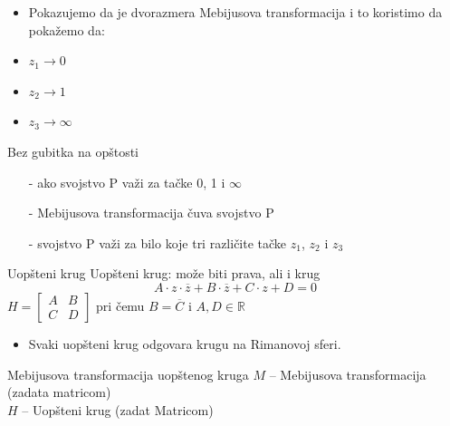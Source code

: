 \documentclass{beamer}
\begin{document}
\begin{frame}
\begin{itemize}
\item Pokazujemo da je dvorazmera Mebijusova transformacija i to 
koristimo da poka\v zemo da:
\item $z_1 \rightarrow 0$
\item $z_2 \rightarrow 1$
\item $z_3 \rightarrow \infty$
\end{itemize}
\begin{block}{Bez gubitka na op\v stosti}
\begin{itemize}
\item[-] ako svojstvo P va\v zi za ta\v cke 0, 1 i $\infty$
\item[-] Mebijusova transformacija \v cuva svojstvo P
\item[-]  svojstvo P va\v zi za bilo koje tri razli\v 
cite ta\v cke $z_1$, $z_2$ i $z_3$
\end{itemize}
\end{block}
\end{frame}

\begin{frame}{Uop\v steni krug}
Uop\v steni krug: mo\v ze biti prava, ali i krug
  $$A\cdot z \cdot \overline{z} + B \cdot \overline{z} + C \cdot z + D = 0$$
  $H = \begin{bmatrix} A & B \\ C & D \end{bmatrix}$ pri \v cemu $B = 
\overline{C}$ i $A, D \in \mathbb{R}$
\begin{itemize}
\item Svaki uop\v steni krug odgovara krugu na Rimanovoj sferi.
\end{itemize}
\end{frame}

\begin{frame}{Mebijusova transformacija uop\v stenog kruga}
$M$ -- Mebijusova transformacija (zadata matricom)\\
$H$ -- Uop\v steni krug (zadat Matricom) 
\end{frame}
\end{document}
